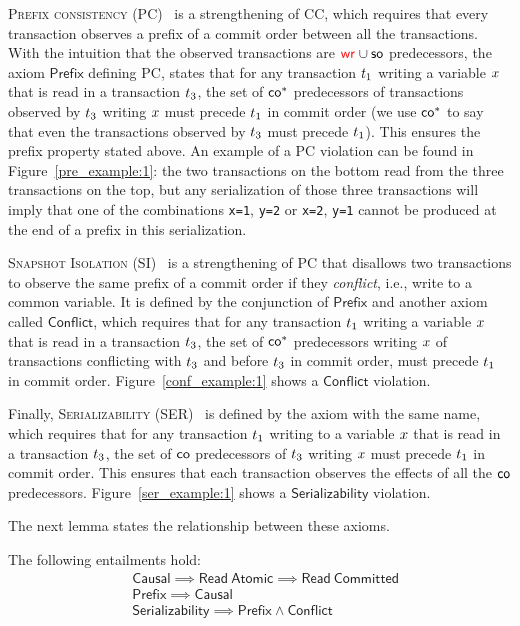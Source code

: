 \textsc{Prefix consistency} (PC)~\cite{DBLP:conf/ecoop/BurckhardtLPF15} is a strengthening of CC, which requires that every transaction observes a prefix of a commit order between all the transactions. With the intuition that the observed transactions are $\textcolor{red}{\mathsf{wr}_{}}\cup\mathsf{so}$ predecessors, the axiom $\mathsf{Prefix}$ defining PC, states that for any transaction ${t}_1$ writing a variable ${x}$ that is read in a transaction ${t}_3$, the set of $\mathsf{co}^*$ predecessors of transactions observed by ${t}_3$ writing ${x}$ must precede ${t}_1$ in commit order (we use $\mathsf{co}^*$ to say that even the transactions observed by ${t}_3$ must precede ${t}_1$). This ensures the prefix property stated above. An example of a PC violation can be found in Figure~\ref{pre_example:1}: the two transactions on the bottom read from the three transactions on the top, but any serialization of those three transactions will imply that one of the combinations {\tt x=1}, {\tt y=2} or {\tt x=2}, {\tt y=1} cannot be produced at the end of a prefix in this serialization.

\textsc{Snapshot Isolation} (SI)~\cite{DBLP:conf/sigmod/BerensonBGMOO95} is a strengthening of PC that disallows two transactions to observe the same prefix of a commit order if they \emph{conflict}, i.e., write to a common variable. It is defined by the conjunction of $\mathsf{Prefix}$ and another axiom called $\mathsf{Conflict}$, which requires that for any transaction ${t}_1$ writing a variable ${x}$ that is read in a transaction ${t}_3$, the set of $\mathsf{co}^*$ predecessors writing ${x}$ of transactions conflicting with ${t}_3$ and before ${t}_3$ in commit order, must precede ${t}_1$ in commit order. Figure~\ref{conf_example:1} shows a $\mathsf{Conflict}$ violation.

Finally, \textsc{Serializability} (SER)~\cite{DBLP:journals/jacm/Papadimitriou79b} is defined by the axiom with the same name, which requires that for any transaction ${t}_1$ writing to a variable ${x}$ that is read in a transaction ${t}_3$, the set of $\mathsf{co}$ predecessors of ${t}_3$ writing ${x}$ must precede ${t}_1$ in commit order. This ensures that each transaction observes the effects of all the $\mathsf{co}$ predecessors. Figure~\ref{ser_example:1} shows a $\mathsf{Serializability}$ violation.

The next lemma states the relationship between these axioms.

\begin{lemma}
 The following entailments hold:
 \begin{align*}
   & \mathsf{Causal} \implies \mathsf{Read\ Atomic}\implies \mathsf{Read\ Committed} \\
   & \mathsf{Prefix} \implies \mathsf{Causal}                                        \\
   & \mathsf{Serializability} \implies \mathsf{Prefix}\land \mathsf{Conflict}        
 \end{align*} 
 \label{axioms-rel}
\end{lemma}

